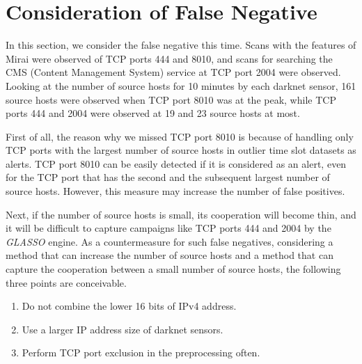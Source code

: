 \documentclass[conference]{IEEEtran}
\begin{document}
\section{Consideration of False Negative}
\label{Consideration}
In this section, we consider the false negative this time.
Scans with the features of Mirai were observed of TCP ports 444 and 8010, and scans for searching the CMS (Content Management System) service at TCP port 2004 were observed.
Looking at the number of source hosts for 10 minutes by each darknet sensor, 161 source hosts were observed when TCP port 8010 was at the peak, while TCP ports 444 and 2004 were observed at 19 and 23 source hosts at most.


First of all, the reason why we missed TCP port 8010 is because of handling only TCP ports with the largest number of source hosts in outlier time slot datasets as alerts.
TCP port 8010 can be easily detected if it is considered as an alert, even for the TCP port that has the second and the subsequent largest number of source hosts.
However, this measure may increase the number of false positives.



Next, if the number of source hosts is small, its cooperation will become thin, and it will be difficult to capture campaigns like TCP ports 444 and 2004 by the \textit{GLASSO} engine.
As a countermeasure for such false negatives, considering a method that can increase the number of source hosts and a method that can capture the cooperation between a small number of source hosts, the following three points are conceivable.
\begin{enumerate}
  \item Do not combine the lower 16 bits of IPv4 address.
  \item Use a larger IP address size of darknet sensors.
  \item Perform TCP port exclusion in the preprocessing often.
\end{enumerate}
\end{document}
